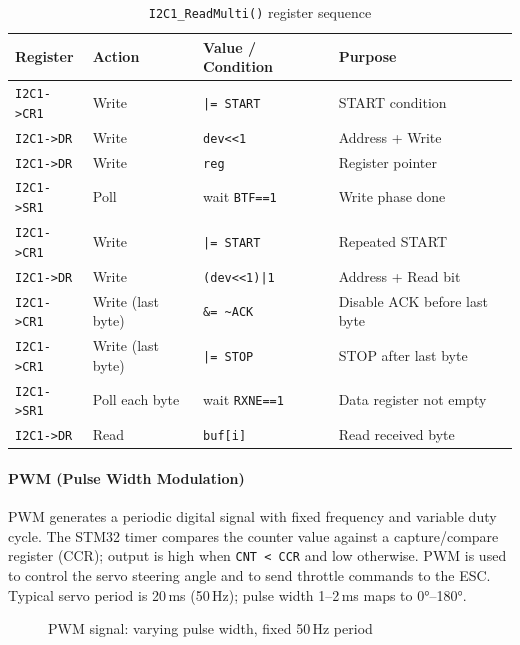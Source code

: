 \documentclass[12pt,a4paper]{article}
\begin{document}
\begin{table}[H]
\centering
\begin{tabular}{llll}
\hline
\textbf{Register} & \textbf{Action} & \textbf{Value / Condition} & \textbf{Purpose} \\
\hline
\texttt{I2C1->CR1}  & Write & \texttt{|= START}     & START condition \\
\texttt{I2C1->DR}   & Write & \texttt{dev<<1}       & Address + Write \\
\texttt{I2C1->DR}   & Write & \texttt{reg}          & Register pointer \\
\texttt{I2C1->SR1}  & Poll  & wait \texttt{BTF==1}  & Write phase done \\
\texttt{I2C1->CR1}  & Write & \texttt{|= START}     & Repeated START \\
\texttt{I2C1->DR}   & Write & \texttt{(dev<<1)|1}   & Address + Read bit \\
\texttt{I2C1->CR1}  & Write (last byte) & \texttt{\&= \textasciitilde ACK} & Disable ACK before last byte \\
\texttt{I2C1->CR1}  & Write (last byte) & \texttt{|= STOP}    & STOP after last byte \\
\texttt{I2C1->SR1}  & Poll each byte & wait \texttt{RXNE==1} & Data register not empty \\
\texttt{I2C1->DR}   & Read  & \texttt{buf[i]}       & Read received byte \\
\hline
\end{tabular}
\caption{\texttt{I2C1\_ReadMulti()} register sequence}
\end{table}

\paragraph{PWM (Pulse Width Modulation)}

PWM generates a periodic digital signal with fixed frequency and variable duty cycle.
The STM32 timer compares the counter value against a capture/compare register (CCR);
output is high when \texttt{CNT < CCR} and low otherwise.
PWM is used to control the servo steering angle and to send throttle commands to the ESC.
Typical servo period is 20\,ms (50\,Hz); pulse width 1--2\,ms maps to 0°--180°.

\begin{figure}[h]
\centering
{}
\caption{PWM signal: varying pulse width, fixed 50\,Hz period}
\end{figure}
\end{document}
